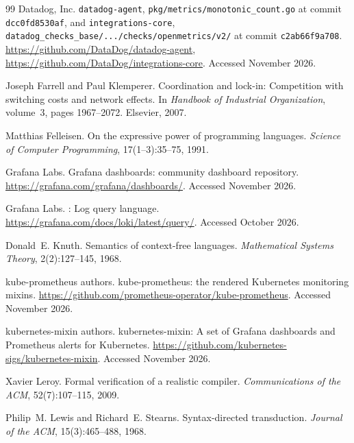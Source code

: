 \begin{thebibliography}{99}
{Datadog, Inc.}
\newblock \texttt{datadog-agent}, \texttt{pkg/metrics/monotonic\_count.go} at commit
\texttt{dcc0fd8530af}, and \texttt{integrations-core},
\texttt{datadog\_checks\_base/.../checks/openmetrics/v2/} at commit \texttt{c2ab66f9a708}.
\newblock \url{https://github.com/DataDog/datadog-agent},
\url{https://github.com/DataDog/integrations-core}. Accessed November 2026.

Joseph Farrell and Paul Klemperer.
\newblock Coordination and lock-in: Competition with switching costs and network effects.
\newblock In \emph{Handbook of Industrial Organization}, volume~3, pages 1967--2072. Elsevier, 2007.

Matthias Felleisen.
\newblock On the expressive power of programming languages.
\newblock \emph{Science of Computer Programming}, 17(1--3):35--75, 1991.

{Grafana Labs}.
\newblock Grafana dashboards: community dashboard repository.
\newblock \url{https://grafana.com/grafana/dashboards/}. Accessed November 2026.

{Grafana Labs}.
: Log query language.
\newblock \url{https://grafana.com/docs/loki/latest/query/}. Accessed October 2026.

Donald~E. Knuth.
\newblock Semantics of context-free languages.
\newblock \emph{Mathematical Systems Theory}, 2(2):127--145, 1968.

{kube-prometheus authors}.
\newblock kube-prometheus: the rendered {Kubernetes} monitoring mixins.
\newblock \url{https://github.com/prometheus-operator/kube-prometheus}. Accessed November 2026.

{kubernetes-mixin authors}.
\newblock kubernetes-mixin: A set of {Grafana} dashboards and {Prometheus} alerts for {Kubernetes}.
\newblock \url{https://github.com/kubernetes-sigs/kubernetes-mixin}. Accessed November 2026.

Xavier Leroy.
\newblock Formal verification of a realistic compiler.
\newblock \emph{Communications of the ACM}, 52(7):107--115, 2009.

Philip~M. Lewis and Richard~E. Stearns.
\newblock Syntax-directed transduction.
\newblock \emph{Journal of the ACM}, 15(3):465--488, 1968.


\end{thebibliography}
